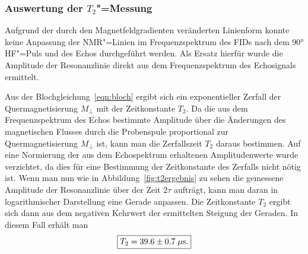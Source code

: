 \subsubsection{Auswertung der $T_2$"=Messung}
Aufgrund der durch den Magnetfeldgradienten veränderten Linienform konnte keine Anpassung der
NMR"=Linien im Frequenzspektrum des FIDs nach dem 90° HF"=Puls und des Echos durchgeführt werden. 
Als Ersatz hierfür wurde die Amplitude der Resonanzlinie direkt aus dem Frequenzspektrum des
Echosignals ermittelt.

Aus der Blochgleichung~\eqref{eqn:bloch} ergibt sich ein exponentieller Zerfall der
Quermagnetisierung $M_\perp$ mit der Zeitkonstante $T_2$. Da die aus dem Frequenzspektrum des Echos
bestimmte Amplitude über die Änderungen des magnetischen Flusses durch die Probenspule proportional zur
Quermagnetisierung $M_\perp$ ist, kann man die Zerfallszeit $T_2$ daraus bestimmen.
Auf eine Normierung der aus dem Echospektrum erhaltenen Amplitudenwerte wurde verzichtet, da dies
für eine Bestimmung der Zeitkonstante des Zerfalls nicht nötig ist. Wenn man nun wie in
Abbildung~\ref{fig:t2ergebnis} zu sehen die gemessene Amplitude der Resonanzlinie über der
Zeit $2\tau$ aufträgt, kann man daran in logarithmischer Darstellung eine Gerade anpassen. Die
Zeitkonstante $T_2$ ergibt sich dann aus dem negativen Kehrwert der ermittelten Steigung der
Geraden. In diesem Fall erhält man 
$$\fbox{$T_2 = 39.6\pm0.7\;\mu$s.}$$


